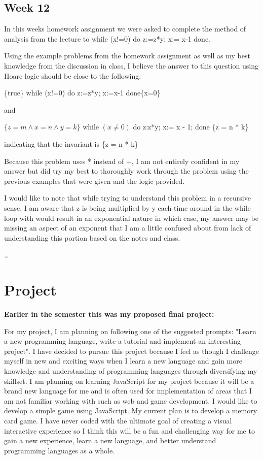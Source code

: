 \documentclass{article}
\theoremstyle{theorem}
\theoremstyle{definition}
\theoremstyle{remark}
\begin{document}
\subsection{Week 12}

In this weeks homework assignment we were asked to complete the method of analysis from the lecture to while (x!=0) do z:=z*y; x:= x-1 done.


Using the example problems from the homework assignment as well as my best knowledge from the discussion in class, I believe the answer to this question using Hoare logic should be close to the following:

\medskip\noindent

\{true\} while (x!=0) do z:=z*y; x:=x-1 done\{x=0\}

and

$\{z = m \wedge{} x = n \wedge{} y = k\}$ while $(x \neq 0)$ do z:z*y; x:= x - 1; done \{z = n * k\}

\medskip\noindent
indicating that the invariant is \{z = n * k\}

\medskip\noindent
Because this problem uses * instead of +, I am not entirely confident in my answer but did try my best to thoroughly work through the problem using the previous examples that were given and the logic provided.

\medskip\noindent
I would like to note that while trying to understand this problem in a recursive sense, I am aware that z is being multiplied by y each time around in the while loop with would result in an exponential nature in which case, my answer may be missing an aspect of an exponent that I am a little confused about from lack of understanding this portion based on the notes and class.

\ldots

\section{Project}

\textbf{Earlier in the semester this was my proposed final project: }

For my project, I am planning on following one of the suggested prompts: "Learn a new programming language, write a tutorial and implement an interesting project". I have decided to pursue this project because I feel as though I challenge myself in new and exciting ways when I learn a new language and gain more knowledge and understanding of programming languages through diversifying my skillset.
I am planning on learning JavaScript for my project because it will be a brand new language for me and is often used for implementation of areas that I am not familiar working with such as web and game development. I would like to develop a simple game using JavaScript. My current plan is to develop a memory card game. I have never coded with the ultimate goal of creating a visual interactive experience so I think this will be a fun and challenging way for me to gain a new experience, learn a new language, and better understand programming languages as a whole.
\end{document}

